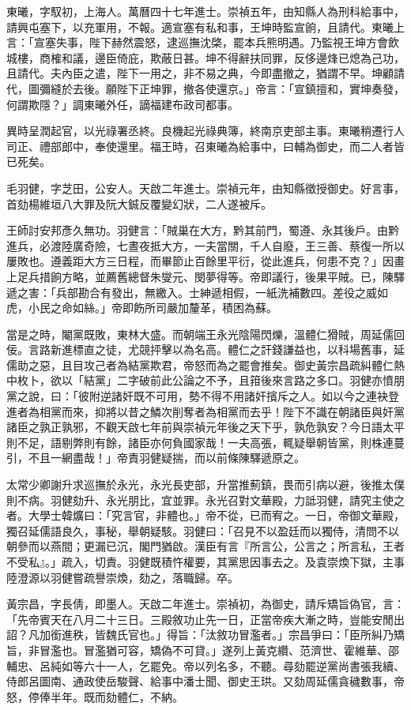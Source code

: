 \begin{pinyinscope}
東曦，字馭初，上海人。萬曆四十七年進士。崇禎五年，由知縣人為刑科給事中，請興屯塞下，以充軍用，不報。適宣塞有私和事，王坤時監宣餉，且請代。東曦上言：「宣塞失事，陛下赫然震怒，逮巡撫沈棨，罷本兵熊明遇。乃監視王坤方會飲城樓，商榷和議，邊臣倚庇，欺蔽日甚。坤不得辭扶同罪，反侈邊烽已熄為己功，且請代。夫內臣之遣，陛下一用之，非不易之典，今即盡撤之，猶謂不早。坤顧請代，圖彌縫於去後。願陛下正坤罪，撤各使還京。」帝言：「宣鎮擅和，實坤奏發，何謂欺隱？」調東曦外任，謫福建布政司都事。

異時呈潤起官，以光祿署丞終。良機起光祿典簿，終南京吏部主事。東曦稍遷行人司正、禮部郎中，奉使還里。福王時，召東曦為給事中，曰輔為御史，而二人者皆已死矣。

毛羽健，字芝田，公安人。天啟二年進士。崇禎元年，由知縣徵授御史。好言事，首劾楊維垣八大罪及阮大鋮反覆變幻狀，二人遂被斥。

王師討安邦彥久無功。羽健言：「賊巢在大方，黔其前門，蜀遵、永其後戶。由黔進兵，必渡陸廣奇險，七晝夜抵大方，一夫當關，千人自廢，王三善、蔡復一所以屢敗也。遵義距大方三日程，而畢節止百餘里平衍，從此進兵，何患不克？」因畫上足兵措餉方略，並薦舊總督朱燮元、閔夢得等。帝即議行，後果平賊。已，陳驛遞之害：「兵部勘合有發出，無繳入。士紳遞相假，一紙洗補數四。差役之威如虎，小民之命如絲。」帝即飭所司嚴加釐革，積困為蘇。

當是之時，閹黨既敗，東林大盛。而朝端王永光陰陽閃爍，溫體仁猾賊，周延儒回佞。言路新進標直之徒，尤競抨擊以為名高。體仁之訐錢謙益也，以科場舊事，延儒助之惡，且目攻己者為結黨欺君，帝怒而為之罷會推矣。御史黃宗昌疏糾體仁熱中枚卜，欲以「結黨」二字破前此公論之不予，且箝後來言路之多口。羽健亦憤朋黨之說，曰：「彼附逆諸奸既不可用，勢不得不用諸奸擯斥之人。如以今之連袂登進者為相黨而來，抑將以昔之鱗次削奪者為相黨而去乎！陛下不識在朝諸臣與奸黨諸臣之孰正孰邪，不觀天啟七年前與崇禎元年後之天下乎，孰危孰安？今日語太平則不足，語剔弊則有餘，諸臣亦何負國家哉！一夫高張，輒疑舉朝皆黨，則株連蔓引，不且一網盡哉！」帝責羽健疑揣，而以前條陳驛遞原之。

太常少卿謝升求巡撫於永光，永光長吏部，升當推薊鎮，畏而引病以避，後推太僕則不病。羽健劾升、永光朋比，宜並罪。永光召對文華殿，力詆羽健，請究主使之者。大學士韓爌曰：「究言官，非體也。」帝不從，已而宥之。一日，帝御文華殿，獨召延儒語良久，事秘，舉朝疑駭。羽健曰：「召見不以盈廷而以獨侍，清問不以朝參而以燕間；更漏已沉，閣門猶啟。漢臣有言『所言公，公言之；所言私，王者不受私』。」疏入，切責。羽健既積忤權要，其黨思因事去之。及袁崇煥下獄，主事陸澄源以羽健嘗疏譽崇煥，劾之，落職歸。卒。

黃宗昌，字長倩，即墨人。天啟二年進士。崇禎初，為御史，請斥矯旨偽官，言：「先帝賓天在八月二十三日。三殿敘功止先一日，正當帝疾大漸之時，豈能安閒出詔？凡加銜進秩，皆魏氏官也。」得旨：「汰敘功冒濫者。」宗昌爭曰：「臣所糾乃矯旨，非冒濫也。冒濫猶可容，矯偽不可貸。」遂列上黃克纘、范濟世、霍維華、邵輔忠、呂純如等六十一人，乞罷免。帝以列名多，不聽。尋劾罷逆黨尚書張我續、侍郎呂圖南、通政使岳駿聲、給事中潘士聞、御史王珙。又劾周延儒貪穢數事，帝怒，停俸半年。既而劾體仁，不納。


\end{pinyinscope}
